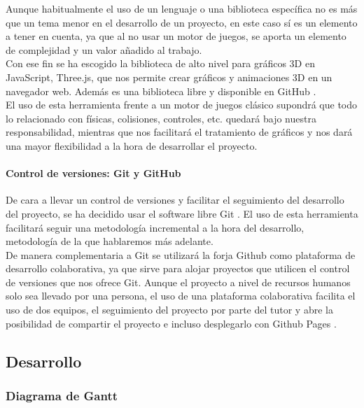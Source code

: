     Aunque habitualmente el uso de un lenguaje o una biblioteca específica no es más que un tema menor en el desarrollo de un proyecto, en este caso sí es un elemento a tener en cuenta, ya que al no usar un motor de juegos, se aporta un elemento de complejidad y un valor añadido al trabajo.\\
    
    Con ese fin se ha escogido la biblioteca de alto nivel para gráficos 3D en JavaScript, Three.js, que nos permite crear gráficos y animaciones 3D en un navegador web. Además es una biblioteca libre y disponible en GitHub \cite{githubThree}.\\
    
    El uso de esta herramienta frente a un motor de juegos clásico supondrá que todo lo relacionado con físicas, colisiones, controles, etc. quedará bajo nuestra responsabilidad, mientras que nos facilitará el tratamiento de gráficos y nos dará una mayor flexibilidad a la hora de desarrollar el proyecto.

\paragraph{Control de versiones: Git y GitHub}

    De cara a llevar un control de versiones y facilitar el seguimiento del desarrollo del proyecto, se ha decidido usar el software libre Git \cite{git}. El uso de esta herramienta facilitará seguir una metodología incremental a la hora del desarrollo, metodología de la que hablaremos más adelante.\\
    
    De manera complementaria a Git se utilizará la forja Github \cite{github} como plataforma de desarrollo colaborativa, ya que sirve para alojar proyectos que utilicen el control de versiones que nos ofrece Git. Aunque el proyecto a nivel de recursos humanos solo sea llevado por una persona, el uso de una plataforma colaborativa facilita el uso de dos equipos, el seguimiento del proyecto por parte del tutor y abre la posibilidad de compartir el proyecto e incluso desplegarlo con Github Pages \cite{githubPages}.

\subsection{Desarrollo}

\subsubsection{Diagrama de Gantt}

